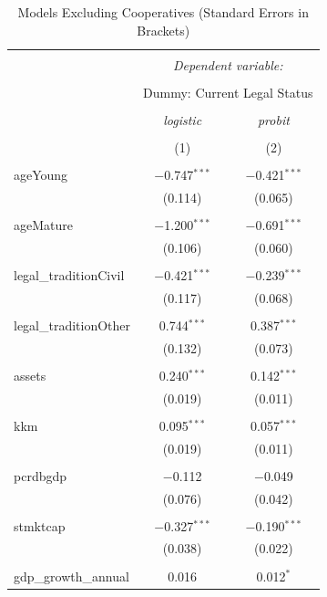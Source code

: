 \documentclass[a4paper, nobind]{templates/ociamthesis}
\begin{document}
\begin{table}[!htbp] \centering 
  \caption{Models Excluding Cooperatives (Standard Errors in Brackets)} 
  \label{} 
\footnotesize 
\begin{tabular}{@{\extracolsep{5pt}}lcc} 
\\[-1.8ex]\hline 
\hline \\[-1.8ex] 
 & \multicolumn{2}{c}{\textit{Dependent variable:}} \\ 
\cline{2-3} 
\\[-1.8ex] & \multicolumn{2}{c}{Dummy: Current Legal Status} \\ 
\\[-1.8ex] & \textit{logistic} & \textit{probit} \\ 
\\[-1.8ex] & (1) & (2)\\ 
\hline \\[-1.8ex] 
 ageYoung & $-$0.747$^{***}$ & $-$0.421$^{***}$ \\ 
  & (0.114) & (0.065) \\ 
  & & \\ 
 ageMature & $-$1.200$^{***}$ & $-$0.691$^{***}$ \\ 
  & (0.106) & (0.060) \\ 
  & & \\ 
 legal\_traditionCivil & $-$0.421$^{***}$ & $-$0.239$^{***}$ \\ 
  & (0.117) & (0.068) \\ 
  & & \\ 
 legal\_traditionOther & 0.744$^{***}$ & 0.387$^{***}$ \\ 
  & (0.132) & (0.073) \\ 
  & & \\ 
 assets & 0.240$^{***}$ & 0.142$^{***}$ \\ 
  & (0.019) & (0.011) \\ 
  & & \\ 
 kkm & 0.095$^{***}$ & 0.057$^{***}$ \\ 
  & (0.019) & (0.011) \\ 
  & & \\ 
 pcrdbgdp & $-$0.112 & $-$0.049 \\ 
  & (0.076) & (0.042) \\ 
  & & \\ 
 stmktcap & $-$0.327$^{***}$ & $-$0.190$^{***}$ \\ 
  & (0.038) & (0.022) \\ 
  & & \\ 
 gdp\_growth\_annual & 0.016 & 0.012$^{*}$ \\ 

\end{tabular}
\end{table}
\end{document}
